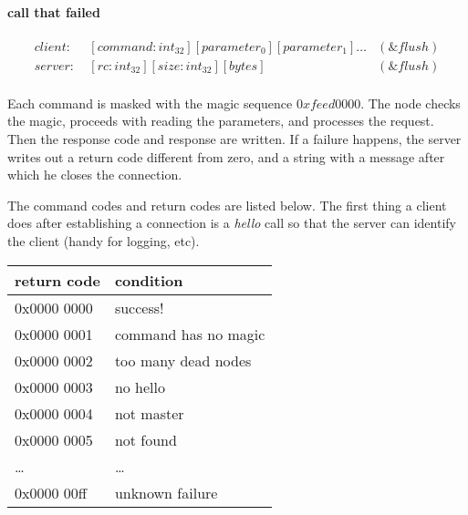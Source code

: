 \paragraph{call that failed}

\begin{equation*}
\begin{aligned}
client: \ & [command : int_{32}][parameter_0][parameter_1]\ldots & (\&flush) \\
server: \ & [rc:int_{32}][size:int_{32}][bytes] & (\&flush) \\
\end{aligned}
\end{equation*}

Each command is masked with the magic sequence $0xfeed0000$.
The node checks the magic, proceeds with reading the parameters, and processes the request.
Then the response code and response are written.
If a failure happens, the server writes out a return code different from zero, and a string with a message after which he closes the connection.

The command codes and return codes are listed below.
The first thing a client does after establishing a connection is a \emph{hello} call so that the server can identify the client (handy for logging, etc).
\begin{table}[ht]
\begin{tabular}{ll}
return code & condition \\
\hline
0x0000 0000  & success!  \\
0x0000 0001  & command has no magic  \\
0x0000 0002  & too many dead nodes \\
0x0000 0003  & no hello        \\
0x0000 0004  & not master      \\
0x0000 0005  & not found       \\
\ldots       & \ldots          \\
0x0000 00ff  & unknown failure \\
\end{tabular}
\end{table}

